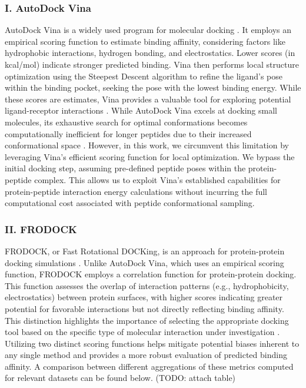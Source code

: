 \subsubsection*{I. AutoDock Vina}
AutoDock Vina is a widely used program for molecular docking \cite{trott2010autodock}. It employs an empirical scoring function to estimate binding affinity, considering factors like hydrophobic interactions, hydrogen bonding, and electrostatics. Lower scores (in kcal/mol) indicate stronger predicted binding. Vina then performs local structure optimization using the Steepest Descent algorithm to refine the ligand's pose within the binding pocket, seeking the pose with the lowest binding energy. While these scores are estimates, Vina provides a valuable tool for exploring potential ligand-receptor interactions \cite{trott2010autodock}. While AutoDock Vina excels at docking small molecules, its exhaustive search for optimal conformations becomes computationally inefficient for longer peptides due to their increased conformational space \cite{rentzsch2015docking}. However, in this work, we circumvent this limitation by leveraging Vina's efficient scoring function for local optimization. We bypass the initial docking step, assuming pre-defined peptide poses within the protein-peptide complex. This allows us to exploit Vina's established capabilities for protein-peptide interaction energy calculations without incurring the full computational cost associated with peptide conformational sampling.

\subsubsection*{II. FRODOCK}
FRODOCK, or Fast Rotational DOCKing, is an approach for protein-protein docking simulations \cite{Aportela2016}. Unlike AutoDock Vina, which uses an empirical scoring function, FRODOCK employs a correlation function for protein-protein docking. This function assesses the overlap of interaction patterns (e.g., hydrophobicity, electrostatics) between protein surfaces, with higher scores indicating greater potential for favorable interactions but not directly reflecting binding affinity. This distinction highlights the importance of selecting the appropriate docking tool based on the specific type of molecular interaction under investigation \cite{Aportela2016}.  \\

Utilizing two distinct scoring functions helps mitigate potential biases inherent to any single method and provides a more robust evaluation of predicted binding affinity. 
A comparison between different aggregations of these metrics computed for relevant datasets can be found below. (TODO: attach table)

